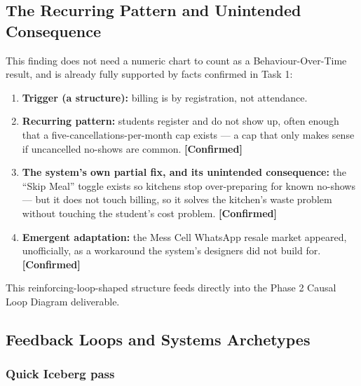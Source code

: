 \documentclass[11pt]{article}
\newcommand{\confirmed}{\textbf{[Confirmed]}}
\begin{document}
\subsection{The Recurring Pattern and Unintended Consequence}

This finding does not need a numeric chart to count as a Behaviour-Over-Time result,
and is already fully supported by facts confirmed in Task 1:

\begin{enumerate}
    \item \textbf{Trigger (a structure):} billing is by registration, not attendance.
    \item \textbf{Recurring pattern:} students register and do not show up, often
        enough that a five-cancellations-per-month cap exists --- a cap that only
        makes sense if uncancelled no-shows are common. \confirmed
    \item \textbf{The system's own partial fix, and its unintended consequence:} the
        ``Skip Meal'' toggle exists so kitchens stop over-preparing for known
        no-shows --- but it does not touch billing, so it solves the kitchen's waste
        problem without touching the student's cost problem. \confirmed
    \item \textbf{Emergent adaptation:} the Mess Cell WhatsApp resale market appeared,
        unofficially, as a workaround the system's designers did not build for.
        \confirmed
\end{enumerate}

This reinforcing-loop-shaped structure feeds directly into the Phase 2 Causal Loop
Diagram deliverable.

\subsection{Feedback Loops and Systems Archetypes}

\subsubsection*{Quick Iceberg pass}
\end{document}
